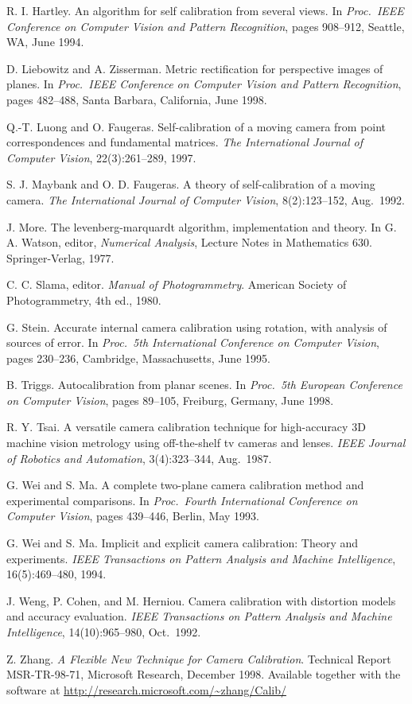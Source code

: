 \documentclass[a4paper,twocolumn,zihao=5,fontset=none,UTF8]{ctexart}
\begin{document}
\begin{enumerate}[label={[\arabic*]},leftmargin=2.2em,itemsep=1pt]
\item R. I. Hartley. An algorithm for self calibration from several views. In \emph{Proc.\ IEEE Conference on Computer Vision and Pattern Recognition}, pages 908--912, Seattle, WA, June 1994.
\item D. Liebowitz and A. Zisserman. Metric rectification for perspective images of planes. In \emph{Proc.\ IEEE Conference on Computer Vision and Pattern Recognition}, pages 482--488, Santa Barbara, California, June 1998.
\item Q.-T. Luong and O. Faugeras. Self-calibration of a moving camera from point correspondences and fundamental matrices. \emph{The International Journal of Computer Vision}, 22(3):261--289, 1997.
\item S. J. Maybank and O. D. Faugeras. A theory of self-calibration of a moving camera. \emph{The International Journal of Computer Vision}, 8(2):123--152, Aug.\ 1992.
\item J. More. The levenberg-marquardt algorithm, implementation and theory. In G. A. Watson, editor, \emph{Numerical Analysis}, Lecture Notes in Mathematics 630. Springer-Verlag, 1977.
\item C. C. Slama, editor. \emph{Manual of Photogrammetry}. American Society of Photogrammetry, 4th ed., 1980.
\item G. Stein. Accurate internal camera calibration using rotation, with analysis of sources of error. In \emph{Proc.\ 5th International Conference on Computer Vision}, pages 230--236, Cambridge, Massachusetts, June 1995.
\item B. Triggs. Autocalibration from planar scenes. In \emph{Proc.\ 5th European Conference on Computer Vision}, pages 89--105, Freiburg, Germany, June 1998.
\item R. Y. Tsai. A versatile camera calibration technique for high-accuracy 3D machine vision metrology using off-the-shelf tv cameras and lenses. \emph{IEEE Journal of Robotics and Automation}, 3(4):323--344, Aug.\ 1987.
\item G. Wei and S. Ma. A complete two-plane camera calibration method and experimental comparisons. In \emph{Proc.\ Fourth International Conference on Computer Vision}, pages 439--446, Berlin, May 1993.
\item G. Wei and S. Ma. Implicit and explicit camera calibration: Theory and experiments. \emph{IEEE Transactions on Pattern Analysis and Machine Intelligence}, 16(5):469--480, 1994.
\item J. Weng, P. Cohen, and M. Herniou. Camera calibration with distortion models and accuracy evaluation. \emph{IEEE Transactions on Pattern Analysis and Machine Intelligence}, 14(10):965--980, Oct.\ 1992.
\item Z. Zhang. \emph{A Flexible New Technique for Camera Calibration}. Technical Report MSR-TR-98-71, Microsoft Research, December 1998. Available together with the software at \url{http://research.microsoft.com/~zhang/Calib/}
\end{enumerate}
\endgroup
\end{document}
